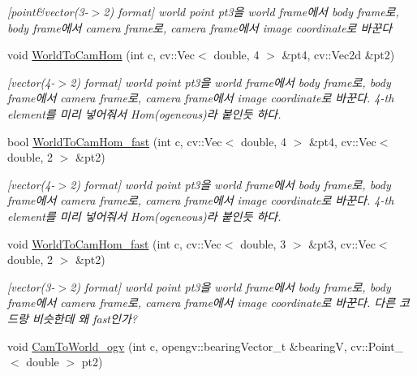 \begin{DoxyCompactItemize}
\begin{DoxyCompactList}\small\item\em \mbox{[}point\&vector(3-\/$>$2) format\mbox{]} world point pt3을 world frame에서 body frame로, body frame에서 camera frame로, camera frame에서 image coordinate로 바꾼다 \end{DoxyCompactList}\item 
void \hyperlink{classMultiColSLAM_1_1cMultiCamSys___a9e6567244dbfa1fc64b2a59ba4653559}{World\+To\+Cam\+Hom} (int c, cv\+::\+Vec$<$ double, 4 $>$ \&pt4, cv\+::\+Vec2d \&pt2)\hypertarget{classMultiColSLAM_1_1cMultiCamSys___a9e6567244dbfa1fc64b2a59ba4653559}{}\label{classMultiColSLAM_1_1cMultiCamSys___a9e6567244dbfa1fc64b2a59ba4653559}

\begin{DoxyCompactList}\small\item\em \mbox{[}vector(4-\/$>$2) format\mbox{]} world point pt3을 world frame에서 body frame로, body frame에서 camera frame로, camera frame에서 image coordinate로 바꾼다. 4-\/th element를 미리 넣어줘서 Hom(ogeneous)라 붙인듯 하다. \end{DoxyCompactList}\item 
bool \hyperlink{classMultiColSLAM_1_1cMultiCamSys___a3b69acbfaf8be51d44ba4b6fa59afa13}{World\+To\+Cam\+Hom\+\_\+fast} (int c, cv\+::\+Vec$<$ double, 4 $>$ \&pt4, cv\+::\+Vec$<$ double, 2 $>$ \&pt2)
\begin{DoxyCompactList}\small\item\em \mbox{[}vector(4-\/$>$2) format\mbox{]} world point pt3을 world frame에서 body frame로, body frame에서 camera frame로, camera frame에서 image coordinate로 바꾼다. 4-\/th element를 미리 넣어줘서 Hom(ogeneous)라 붙인듯 하다. \end{DoxyCompactList}\item 
void \hyperlink{classMultiColSLAM_1_1cMultiCamSys___a32ccb45fcc1754abf27858be133b25ed}{World\+To\+Cam\+Hom\+\_\+fast} (int c, cv\+::\+Vec$<$ double, 3 $>$ \&pt3, cv\+::\+Vec$<$ double, 2 $>$ \&pt2)\hypertarget{classMultiColSLAM_1_1cMultiCamSys___a32ccb45fcc1754abf27858be133b25ed}{}\label{classMultiColSLAM_1_1cMultiCamSys___a32ccb45fcc1754abf27858be133b25ed}

\begin{DoxyCompactList}\small\item\em \mbox{[}vector(3-\/$>$2) format\mbox{]} world point pt3을 world frame에서 body frame로, body frame에서 camera frame로, camera frame에서 image coordinate로 바꾼다. 다른 코드랑 비슷한데 왜 fast인가? \end{DoxyCompactList}\item 
void \hyperlink{classMultiColSLAM_1_1cMultiCamSys___aad5f0cfbbd2017e49b49b0a49d5acda6}{Cam\+To\+World\+\_\+ogv} (int c, opengv\+::bearing\+Vector\+\_\+t \&bearingV, cv\+::\+Point\+\_\+$<$ double $>$ pt2)\hypertarget{classMultiColSLAM_1_1cMultiCamSys___aad5f0cfbbd2017e49b49b0a49d5acda6}{}\label{classMultiColSLAM_1_1cMultiCamSys___aad5f0cfbbd2017e49b49b0a49d5acda6}


\end{DoxyCompactItemize}
